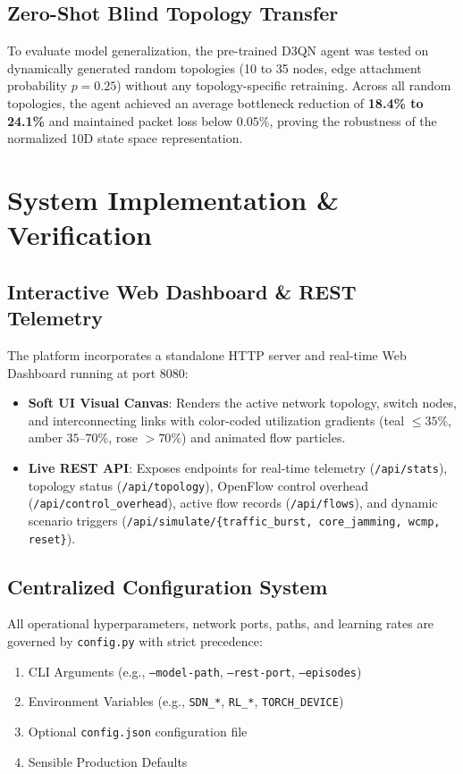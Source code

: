 \documentclass[10pt,twocolumn,a4paper]{article}
\begin{document}
\subsection{Zero-Shot Blind Topology Transfer}
To evaluate model generalization, the pre-trained D3QN agent was tested on dynamically generated random topologies (10 to 35 nodes, edge attachment probability $p=0.25$) without any topology-specific retraining. Across all random topologies, the agent achieved an average bottleneck reduction of \textbf{18.4\% to 24.1\%} and maintained packet loss below $0.05\%$, proving the robustness of the normalized 10D state space representation.

\section{System Implementation \& Verification}

\subsection{Interactive Web Dashboard \& REST Telemetry}
The platform incorporates a standalone HTTP server and real-time Web Dashboard running at port 8080:
\begin{itemize}[leftmargin=*,itemsep=1pt,topsep=2pt]
    \item \textbf{Soft UI Visual Canvas}: Renders the active network topology, switch nodes, and interconnecting links with color-coded utilization gradients (teal $\le 35\%$, amber $35$--$70\%$, rose $>70\%$) and animated flow particles.
    \item \textbf{Live REST API}: Exposes endpoints for real-time telemetry (\texttt{/api/stats}), topology status (\texttt{/api/topology}), OpenFlow control overhead (\texttt{/api/control\_overhead}), active flow records (\texttt{/api/flows}), and dynamic scenario triggers (\texttt{/api/simulate/\{traffic\_burst, core\_jamming, wcmp, reset\}}).
\end{itemize}

\subsection{Centralized Configuration System}
All operational hyperparameters, network ports, paths, and learning rates are governed by \texttt{config.py} with strict precedence:
\begin{enumerate}[leftmargin=*,itemsep=1pt,topsep=2pt]
    \item CLI Arguments (e.g., \texttt{--model-path}, \texttt{--rest-port}, \texttt{--episodes})
    \item Environment Variables (e.g., \texttt{SDN\_*}, \texttt{RL\_*}, \texttt{TORCH\_DEVICE})
    \item Optional \texttt{config.json} configuration file
    \item Sensible Production Defaults
\end{enumerate}
\end{document}
